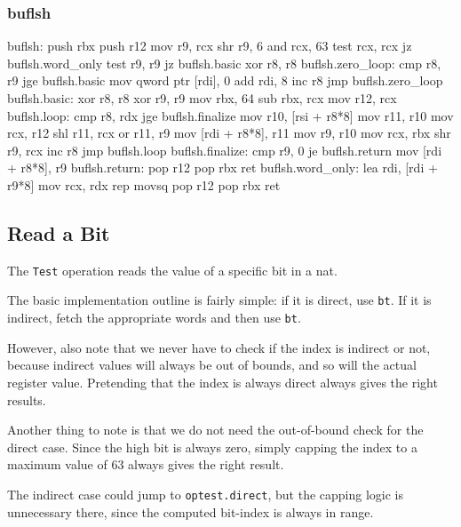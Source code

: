 \subsubsection{buflsh}

\begin{asm}
buflsh:
	push	rbx
	push	r12
	mov	r9, rcx
	shr	r9, 6
	and	rcx, 63
	test	rcx, rcx
	jz	buflsh.word_only
	test	r9, r9
	jz	buflsh.basic
	xor	r8, r8
buflsh.zero_loop:
	cmp	r8, r9
	jge	buflsh.basic
	mov	qword ptr [rdi], 0
	add	rdi, 8
	inc	r8
	jmp	buflsh.zero_loop
buflsh.basic:
	xor	r8, r8
	xor	r9, r9
	mov	rbx, 64
	sub	rbx, rcx
	mov	r12, rcx
buflsh.loop:
	cmp	r8, rdx
	jge	buflsh.finalize
	mov	r10, [rsi + r8*8]
	mov	r11, r10
	mov	rcx, r12
	shl	r11, rcx
	or	r11, r9
	mov	[rdi + r8*8], r11
	mov	r9, r10
	mov	rcx, rbx
	shr	r9, rcx
	inc	r8
	jmp	buflsh.loop
buflsh.finalize:
	cmp	r9, 0
	je	buflsh.return
	mov	[rdi + r8*8], r9
buflsh.return:
	pop	r12
	pop	rbx
	ret
buflsh.word_only:
	lea	rdi, [rdi + r9*8]
	mov	rcx, rdx
	rep	movsq
	pop	r12
	pop	rbx
	ret
\end{asm}

\subsection{Read a Bit}

The \lstinline|Test| operation reads the value of a specific bit in
a nat.

The basic implementation outline is fairly simple: if it is direct,
use \lstinline|bt|.  If it is indirect, fetch the appropriate words and
then use \lstinline|bt|.

However, also note that we never have to check if the index is indirect
or not, because indirect values will always be out of bounds, and so
will the actual register value.  Pretending that the index is always
direct always gives the right results.

Another thing to note is that we do not need the out-of-bound check for
the direct case.  Since the high bit is always zero, simply capping
the index to a maximum value of 63 always gives the right result.

The indirect case could jump to \lstinline|optest.direct|, but the
capping logic is unnecessary there, since the computed bit-index is
always in range.

